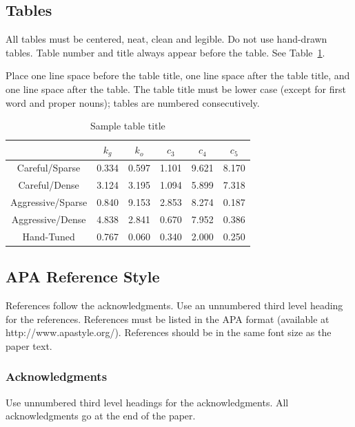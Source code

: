 \documentclass{article}
\begin{document}
\subsection{Tables}

All tables must be centered, neat, clean and legible. Do not use hand-drawn
tables. Table number and title always appear before the table. See
Table~\ref{sample-table}.

Place one line space before the table title, one line space after the table
title, and one line space after the table. The table title must be lower case
(except for first word and proper nouns); tables are numbered consecutively.

\begin{table}[t]
\caption{Sample table title} \label{sample-table}
\begin{center}
\begin{tabular}{|c|c|c|c|c|c|}
  \hline
   & $k_{g}$ & $k_{o}$ & $c_{3}$ & $c_{4}$ & $c_{5}$ \\
  \hline\hline
  Careful/Sparse & 0.334 & 0.597 & 1.101 & 9.621 & 8.170 \\ \hline
  Careful/Dense & 3.124 & 3.195 & 1.094 & 5.899 & 7.318 \\ \hline
  Aggressive/Sparse & 0.840 & 9.153 & 2.853 & 8.274 & 0.187 \\ \hline
  Aggressive/Dense & 4.838 & 2.841 & 0.670 & 7.952 & 0.386 \\ \hline
  Hand-Tuned & 0.767 & 0.060 & 0.340 & 2.000 & 0.250 \\
  \hline
\end{tabular}
\end{center}
\end{table}

\subsection{APA Reference Style}

References follow the acknowledgments. Use an unnumbered third level
heading for the references. References must be listed in the APA
format (available at http://www.apastyle.org/). References should be
in the same font size as the paper text.

\subsubsection*{Acknowledgments}
Use unnumbered third level headings for the acknowledgments. All
acknowledgments go at the end of the paper.

%
%
\end{document}
